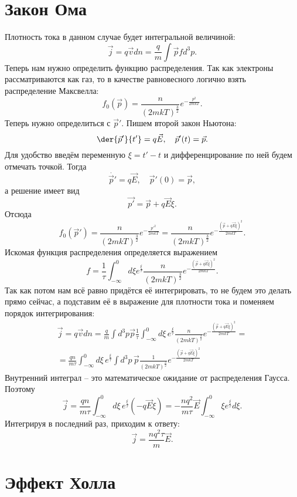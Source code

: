 \section{Закон Ома}
Плотность тока в данном случае будет интегральной величиной:
\[
    \vec{j} = q\vec{v}dn = \frac{q}{m}\int\vec{p} f d^3p.
\]
Теперь нам нужно определить функцию распределения. Так как электроны
рассматриваются как газ, то в качестве равновесного логично взять распределение
Максвелла:
\[
    f_0(\vec{p}) = \frac{n}{(2mkT)^\frac{3}{2}}e^{-\frac{p^2}{2mkT}}.
\]
Теперь нужно определиться с \( \vec{p}' \). Пишем второй закон Ньютона:
\[
    \der{\vec{p}'}{t'} = q\vec{E}, \quad \vec{p}'(t) = \vec{p}.
\]
Для удобство введём переменную \( \xi = t' - t \) и дифференцирование по ней
будем отмечать точкой. Тогда
\[
    \dot{\vec{p}'} = q\vec{E}, \quad \vec{p}'(0) = \vec{p},
\]
а решение имеет вид
\[
    \vec{p'} = \vec{p} + q\vec{E}\xi.
\]
Отсюда
\[
    f_0(\vec{p}') = \frac{n}{(2mkT)^\frac{3}{2}}e^{-\frac{{p'}^2}{2mkT}} =
    \frac{n}{(2mkT)^\frac{3}{2}}e^{-\frac{(\vec{p} + q\vec{E}\xi)^2 }{2mkT}}.
\]
Искомая функция распределения определяется выражением
\[
    f = \frac{1}{\tau}\int_{-\infty}^0 d\xi e^\frac{\xi}{\tau}
    \frac{n}{(2mkT)^\frac{3}{2}}e^{-\frac{(\vec{p} + q\vec{E}\xi)^2 }{2mkT}}.
\]
Так как потом нам всё равно придётся её интегрировать, то не будем это делать
прямо сейчас, а подставим её в выражение для плотности тока и поменяем порядок
интегрирования:
\begin{gather*}
    \vec{j} = q\vec{v}dn = \frac{q}{m}\int d^3p \vec{p}
    \frac{1}{\tau}\int_{-\infty}^0 d\xi\, e^\frac{\xi}{\tau}
    \frac{n}{(2mkT)^\frac{3}{2}}e^{-\frac{(\vec{p} + q\vec{E}\xi)^2 }{2mkT}}
    = \\ =
    \frac{qn}{m\tau}
    \int_{-\infty}^0 d\xi\, e^\frac{\xi}{\tau}\int d^3p\, \vec{p}
    \frac{1}{(2mkT)^\frac{3}{2}}e^{-\frac{(\vec{p} + q\vec{E}\xi)^2 }{2mkT}}
\end{gather*}
Внутренний интеграл -- это математическое ожидание от распределения Гаусса.
Поэтому
\[
    \vec{j} = \frac{qn}{m\tau}
    \int_{-\infty}^0 d\xi\, e^\frac{\xi}{\tau} (-q\vec{E}\xi) =
    -\frac{nq^2}{m\tau} \vec{E} \int_{-\infty}^0 \xi e^\frac{\xi}{\tau}d\xi.
\]
Интегрируя в последний раз, приходим к ответу:
\[
    \vec{j} = \frac{nq^2\tau}{m}\vec{E}.
\]
\section{Эффект Холла}

